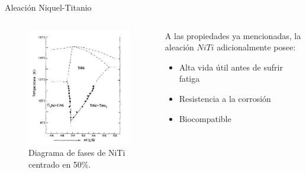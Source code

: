 \documentclass[11pt]{beamer}
\begin{document}
		\begin{frame}{Aleación Niquel-Titanio}
			\begin{columns}[T]
				\begin{column}{.49\textwidth}
					\begin{figure}[H]
					\centering
					\includegraphics[scale=0.25]{img/DiagramaNiTi.jpg}
					\caption*{Diagrama de fases de NiTi centrado en 50\%.}
					\end{figure}
				\end{column}
				\begin{column}{.49\textwidth}
				A las propiedades ya mencionadas, la aleación $NiTi$ adicionalmente posee:
					\begin{itemize}
						\item Alta vida útil antes de sufrir fatiga
						\item Resistencia a la corrosión
						\item Biocompatible
					\end{itemize}
				\end{column}
			\end{columns}
		\end{frame}
		
\end{document}
